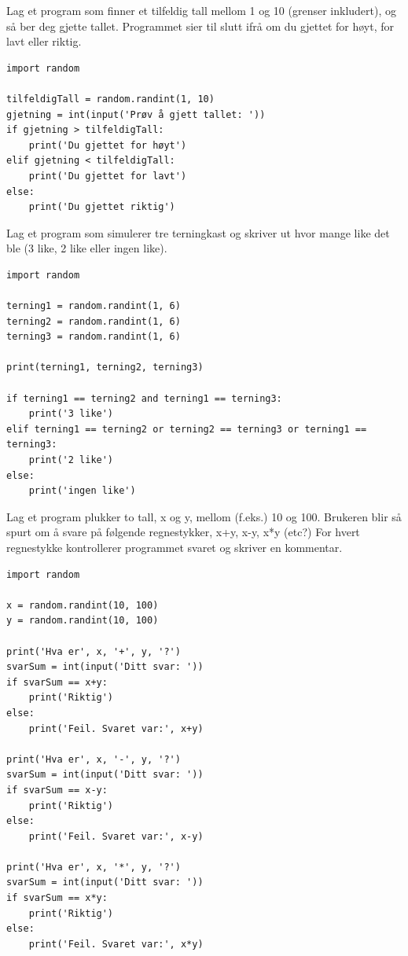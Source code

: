 \begin{exercise}
Lag et program som finner et tilfeldig tall mellom 1 og 10 (grenser inkludert), og så ber deg gjette tallet. Programmet sier til slutt ifrå om du gjettet for høyt, for lavt eller riktig.
\end{exercise}
\begin{solution}
\begin{lstlisting}
import random

tilfeldigTall = random.randint(1, 10)
gjetning = int(input('Prøv å gjett tallet: '))
if gjetning > tilfeldigTall:
    print('Du gjettet for høyt')
elif gjetning < tilfeldigTall:
    print('Du gjettet for lavt')
else:
    print('Du gjettet riktig')
\end{lstlisting}
\end{solution}

\begin{exercise}
Lag et program som simulerer tre terningkast og skriver ut hvor mange like det ble (3 like, 2 like eller ingen like).
\end{exercise}
\begin{solution}
\begin{lstlisting}
import random

terning1 = random.randint(1, 6)
terning2 = random.randint(1, 6)
terning3 = random.randint(1, 6)

print(terning1, terning2, terning3)

if terning1 == terning2 and terning1 == terning3:
    print('3 like')
elif terning1 == terning2 or terning2 == terning3 or terning1 == terning3:
    print('2 like')
else:
    print('ingen like')
\end{lstlisting}
\end{solution}

\begin{exercise}
Lag et program plukker to tall, x og y, mellom (f.eks.) 10 og 100. Brukeren blir så spurt om å svare på følgende regnestykker, x+y, x-y, x*y (etc?) For hvert regnestykke kontrollerer programmet svaret og skriver en kommentar. 
\end{exercise}
\begin{solution}
\begin{lstlisting}
import random

x = random.randint(10, 100)
y = random.randint(10, 100)

print('Hva er', x, '+', y, '?')
svarSum = int(input('Ditt svar: '))
if svarSum == x+y:
    print('Riktig')
else:
    print('Feil. Svaret var:', x+y)

print('Hva er', x, '-', y, '?')
svarSum = int(input('Ditt svar: '))
if svarSum == x-y:
    print('Riktig')
else:
    print('Feil. Svaret var:', x-y)

print('Hva er', x, '*', y, '?')
svarSum = int(input('Ditt svar: '))
if svarSum == x*y:
    print('Riktig')
else:
    print('Feil. Svaret var:', x*y)
\end{lstlisting}
\end{solution}

